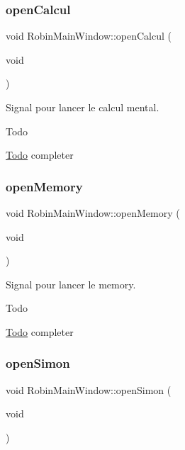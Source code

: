 \subsubsection{\texorpdfstring{open\+Calcul}{openCalcul}}
{\footnotesize\ttfamily void Robin\+Main\+Window\+::open\+Calcul (\begin{DoxyParamCaption}\item[{void}]{ }\end{DoxyParamCaption})\hspace{0.3cm}{\ttfamily [slot]}}



Signal pour lancer le calcul mental. 

\begin{DoxyRefDesc}{Todo}
\item[\hyperlink{todo__todo000022}{Todo}]completer \end{DoxyRefDesc}
\mbox{\label{class_robin_main_window_aaf62641d678eb0f8829a2fb9c513ae68}} 
\subsubsection{\texorpdfstring{open\+Memory}{openMemory}}
{\footnotesize\ttfamily void Robin\+Main\+Window\+::open\+Memory (\begin{DoxyParamCaption}\item[{void}]{ }\end{DoxyParamCaption})\hspace{0.3cm}{\ttfamily [slot]}}



Signal pour lancer le memory. 

\begin{DoxyRefDesc}{Todo}
\item[\hyperlink{todo__todo000024}{Todo}]completer \end{DoxyRefDesc}
\mbox{\label{class_robin_main_window_ab00b403de3169493a08c53f5d623ce6b}} 
\subsubsection{\texorpdfstring{open\+Simon}{openSimon}}
{\footnotesize\ttfamily void Robin\+Main\+Window\+::open\+Simon (\begin{DoxyParamCaption}\item[{void}]{ }\end{DoxyParamCaption})\hspace{0.3cm}{\ttfamily [slot]}}




